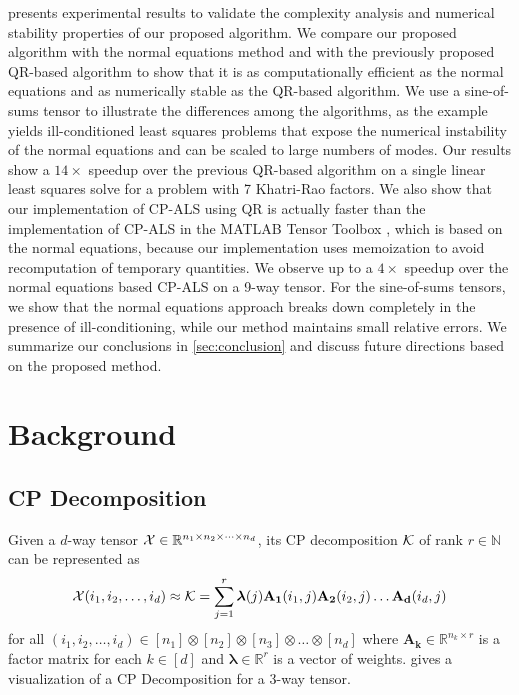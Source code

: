 \documentclass{article}
\newcommand{\mat}[1]{\mathbf{#1}}
\newcommand{\V}[2][]{\bm{#1{\mathbf{\MakeLowercase{#2}}}}} 		%
\newcommand{\T}[2][]{#1{\mathbf{\cal{#2}}}} 						%
\begin{document}
 presents experimental results to validate the complexity analysis and numerical stability properties of our proposed algorithm.
We compare our proposed algorithm with the normal equations method and with the previously proposed QR-based algorithm to show that it is as computationally efficient as the normal equations and as numerically stable as the QR-based algorithm.
We use a sine-of-sums tensor \cite{BM02} to illustrate the differences among the algorithms, as the example yields ill-conditioned least squares problems that expose the numerical instability of the normal equations and can be scaled to large numbers of modes.
Our results show a $14\times$ speedup over the previous QR-based algorithm on a single linear least squares solve for a problem with 7 Khatri-Rao factors.
We also show that our implementation of CP-ALS using QR is actually faster than the implementation of CP-ALS in the MATLAB Tensor Toolbox \cite{TensorToolbox}, which is based on the normal equations, because our implementation uses memoization to avoid recomputation of temporary quantities.
We observe up to a $4\times$ speedup over the normal equations based CP-ALS on a 9-way tensor.
For the sine-of-sums tensors, we show that the normal equations approach breaks down completely in the presence of ill-conditioning, while our method maintains small relative errors.
We summarize our conclusions in \cref{sec:conclusion} and discuss future directions based on the proposed method.

\section{Background} 
\label{sec:background}

\subsection{CP Decomposition}
Given a $d$-way tensor $\T{X} \in \mathbb{R}^{n_1\times n_2\times \dots \times n_d}$, its
CP decomposition $\T{K}$ of rank $r \in \mathbb{N}$ can be represented as 
\begin{equation}
\label{eq:CP}
\T{X}(i_1,i_2,\dots, i_d) \approx \T{K} = \sum^{r}_{j=1} \V{\lambda}(j) \mat{A_1}(i_1,j)\mat{A_2}(i_2,j) \dots \mat{A_d}(i_d,j)
\end{equation}
for all $(i_1,i_2,\dots, i_d) \in [n_1] \otimes [n_2] \otimes [n_3] \otimes \dots \otimes [n_d]$ where $\mat{A_k} \in \mathbb{R}^{n_k \times r}$ is a factor matrix for each $k \in [d]$ and $\bm{\lambda}\in\mathbb{R}^r$ is a vector of weights. 
 gives a visualization of a CP Decomposition for a 3-way tensor.
\end{document}
